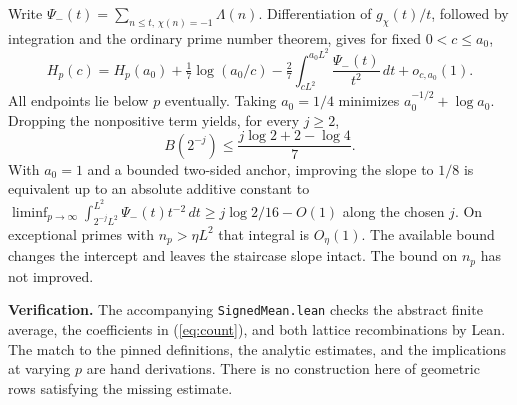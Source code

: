 \documentclass[11pt]{article}
\begin{document}
Write $\Psi_-(t)=\sum_{n\le t,\,\chi(n)=-1}\Lambda(n)$. Differentiation of $g_\chi(t)/t$, followed by integration and the ordinary prime number theorem, gives for fixed $0<c\le a_0$,
\[
 H_p(c)=H_p(a_0)+\tfrac17\log(a_0/c)
   -\tfrac27\int_{cL^2}^{a_0 L^2}\frac{\Psi_-(t)}{t^2}\,dt+o_{c,a_0}(1).
\]
All endpoints lie below $p$ eventually. Taking $a_0=1/4$ minimizes $a_0^{-1/2}+\log a_0$. Dropping the nonpositive term yields, for every $j\ge2$,
\[
 \boxed{\displaystyle B(2^{-j})\le\frac{j\log2+2-\log4}{7}.}
\]
With $a_0=1$ and a bounded two-sided anchor, improving the slope to $1/8$ is equivalent up to an absolute additive constant to $\liminf_{p\to\infty}\int_{2^{-j}L^2}^{L^2}\Psi_-(t)t^{-2}\,dt\ge j\log2/16-O(1)$ along the chosen $j$. On exceptional primes with $n_p>\eta L^2$ that integral is $O_\eta(1)$. The available bound changes the intercept and leaves the staircase slope intact. The bound on $n_p$ has not improved.

\textbf{Verification.} The accompanying \texttt{SignedMean.lean} checks the abstract finite average, the coefficients in (\ref{eq:count}), and both lattice recombinations by Lean. The match to the pinned definitions, the analytic estimates, and the implications at varying $p$ are hand derivations. There is no construction here of geometric rows satisfying the missing estimate.
\end{document}
